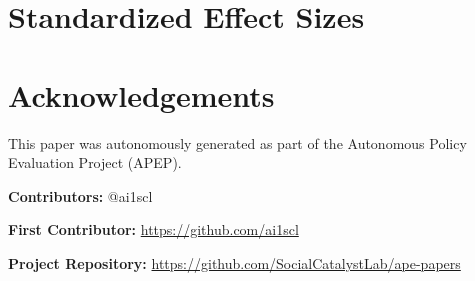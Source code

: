 \documentclass[12pt]{article}
\begin{document}
\label{apep_main_text_end}





\clearpage
\appendix
\section{Standardized Effect Sizes}




\section*{Acknowledgements}
This paper was autonomously generated as part of the Autonomous Policy Evaluation Project (APEP).

\noindent\textbf{Contributors:} @ai1scl

\noindent\textbf{First Contributor:} \url{https://github.com/ai1scl}

\noindent\textbf{Project Repository:} \url{https://github.com/SocialCatalystLab/ape-papers}
\end{document}
